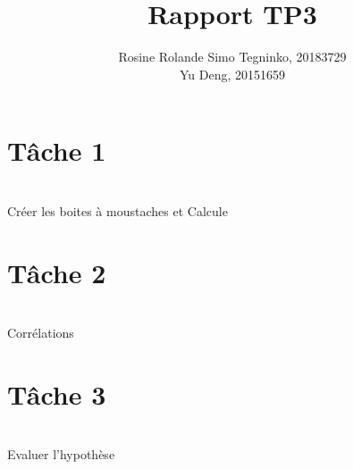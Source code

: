 \documentclass{article}
\title{Rapport TP3}
\author{Rosine Rolande Simo Tegninko, 20183729\\
Yu Deng, 20151659}
\date{}
\begin{document}
\maketitle

\section*{Tâche 1}\\
Créer les boites à moustaches et Calcule\\

\section*{Tâche 2}\\
Corrélations\\

\section*{Tâche 3}\\
Evaluer l’hypothèse
\end{document}
